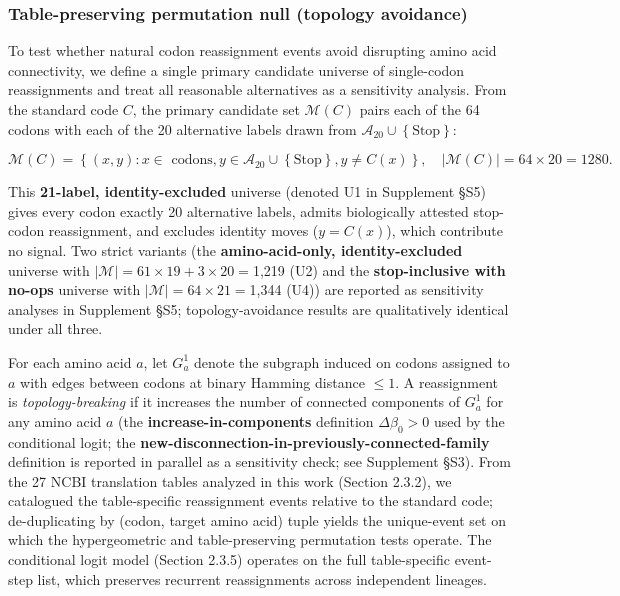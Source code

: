 \documentclass[preprint,11pt,authoryear,a4paper]{elsarticle}
\begin{document}
\subsubsection{Table-preserving permutation null (topology
avoidance)}\label{sec:null-topo}

To test whether natural codon reassignment events avoid disrupting amino
acid connectivity, we define a single primary candidate universe of
single-codon reassignments and treat all reasonable alternatives as a
sensitivity analysis. From the standard code \(C\), the primary
candidate set \(\mathcal{M}(C)\) pairs each of the 64 codons with each
of the 20 alternative labels drawn from
\(\mathcal{A}_{20} \cup \left\{ \text{Stop} \right\}\):

\[\mathcal{M}(C) = \left\{ (x,y):x \in \text{ codons},y \in \mathcal{A}_{20} \cup \left\{ \text{Stop} \right\},y \neq C(x) \right\},\quad\left| {\mathcal{M}(C)} \right| = 64 \times 20 = 1280.\]
\protect{}\label{eq:candidate}{}

This \textbf{21-label, identity-excluded} universe (denoted U1 in
Supplement §S5) gives every codon exactly 20 alternative labels, admits
biologically attested stop-codon reassignment, and excludes identity
moves (\(y = C(x)\)), which contribute no signal. Two strict variants
(the \textbf{amino-acid-only, identity-excluded} universe with
\(\left| \mathcal{M} \right| = 61 \times 19 + 3 \times 20 =\)1,219 (U2)
and the \textbf{stop-inclusive with no-ops} universe with
\(\left| \mathcal{M} \right| = 64 \times 21 =\)1,344 (U4)) are reported
as sensitivity analyses in Supplement §S5; topology-avoidance results
are qualitatively identical under all three.

For each amino acid \(a\), let \(G_{a}^{1}\) denote the subgraph induced
on codons assigned to \(a\) with edges between codons at binary Hamming
distance \(\leq 1\). A reassignment is \emph{topology-breaking} if it
increases the number of connected components of \(G_{a}^{1}\) for any
amino acid \(a\) (the \textbf{increase-in-components} definition
\(\Delta\beta_{0} > 0\) used by the conditional logit; the
\textbf{new-disconnection-in-previously-connected-family} definition is
reported in parallel as a sensitivity check; see Supplement §S3). From
the 27 NCBI translation tables analyzed in this work (Section 2.3.2), we
catalogued the table-specific reassignment events relative to the
standard code; de-duplicating by (codon, target amino acid) tuple yields
the unique-event set on which the hypergeometric and table-preserving
permutation tests operate. The conditional logit model (Section 2.3.5)
operates on the full table-specific event-step list, which preserves
recurrent reassignments across independent lineages.
\end{document}
